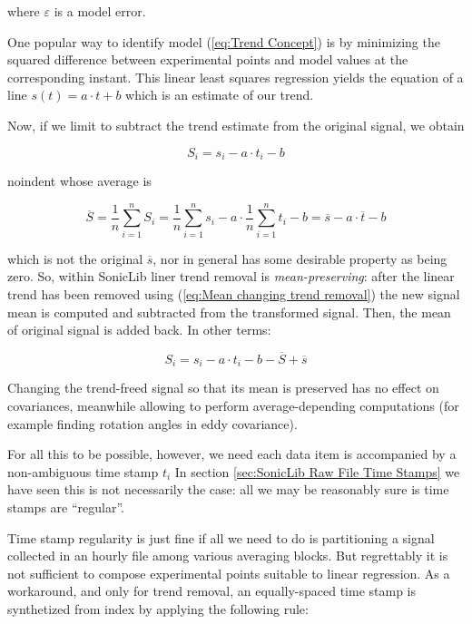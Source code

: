 \documentclass[a4paper,10pt]{book}
\begin{document}
\noindent where $\varepsilon$ is a model error.

One popular way to identify model (\ref{eq:Trend Concept}) is by minimizing the squared difference between experimental points and model values at the corresponding instant. This linear least squares regression yields the equation of a line $s(t) = a \cdot t + b$ which is an estimate of our trend.

Now, if we limit to subtract the trend estimate from the original signal, we obtain

\begin{equation}\label{eq:Mean changing trend removal}
 S_{i} = s_{i} - a \cdot t_{i} - b
\end{equation}

noindent whose average is

\begin{equation}
 \overline{S} = \frac{1}{n} \sum_{i=1}^{n} S_{i} = \frac{1}{n} \sum_{i=1}^{n} s_{i} - a \cdot \frac{1}{n} \sum_{i=1}^{n} t_{i} - b = \overline{s} - a \cdot \overline{t} - b
\end{equation}

\noindent which is not the original $\overline{s}$, nor in general has some desirable property as being zero. So, within SonicLib liner trend removal is \emph{mean-preserving}: after the linear trend has been removed using (\ref{eq:Mean changing trend removal}) the new signal mean is computed and subtracted from the transformed signal. Then, the mean of original signal is added back. In other terms:

\begin{equation}\label{eq:Mean preserving trend removal}
 S_{i} = s_{i} - a \cdot t_{i} - b - \overline{S} + \overline{s}
\end{equation}

Changing the trend-freed signal so that its mean is preserved has no effect on covariances, meanwhile allowing to perform average-depending computations (for example finding rotation angles in eddy covariance).

For all this to be possible, however, we need each data item is accompanied by a non-ambiguous time stamp $t_{i}$ In section \ref{sec:SonicLib Raw File Time Stamps} we have seen this is not necessarily the case: all we may be reasonably sure is time stamps are ``regular''.

Time stamp regularity is just fine if all we need to do is partitioning a signal collected in an hourly file among various averaging blocks. But regrettably it is not sufficient to compose experimental points suitable to linear regression. As a workaround, and only for trend removal, an equally-spaced time stamp is synthetized from index by applying the following rule:
\end{document}

